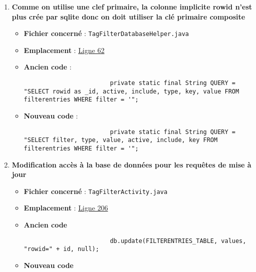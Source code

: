 \begin{enumerate}
\begin{itemize}
\begin{verbatim}
                    \end{verbatim}
          \end{itemize}
    \item \textbf{Comme on utilise une clef primaire, la colonne implicite rowid n’est plus crée par sqlite donc on doit utiliser la clé primaire composite}
          \begin{itemize}
              \item \textbf{Fichier concerné} : \texttt{TagFilterDatabaseHelper.java}
              \item \textbf{Emplacement} :
                    \href{https://github.com/MarcusWolschon/osmeditor4android/blob/dcabe8084aa15f5551a37c990516bf73398af1bf/src/main/java/de/blau/android/filter/TagFilterActivity.java#L62C5-L62C134}{Ligne 62}
              \item \textbf{Ancien code} :
                    \begin{verbatim}
                        private static final String QUERY = "SELECT rowid as _id, active, include, type, key, value FROM filterentries WHERE filter = '";
                    \end{verbatim}
              \item \textbf{Nouveau code} :
                    \begin{verbatim}
                        private static final String QUERY = "SELECT filter, type, value, active, include, key FROM filterentries WHERE filter = '";
                    \end{verbatim}
          \end{itemize}
    \item \textbf{Modification accès à la base de données pour les requêtes de mise à jour}
          \begin{itemize}
              \item \textbf{Fichier concerné} : \texttt{TagFilterActivity.java}
              \item \textbf{Emplacement} :
                    \href{https://github.com/MarcusWolschon/osmeditor4android/blob/dcabe8084aa15f5551a37c990516bf73398af1bf/src/main/java/de/blau/android/filter/TagFilterActivity.java#L206}{Ligne 206}
              \item \textbf{Ancien code}
                    \begin{verbatim}
                        db.update(FILTERENTRIES_TABLE, values, "rowid=" + id, null);
                    \end{verbatim}
              \item \textbf{Nouveau code}

\end{itemize}
\end{enumerate}
